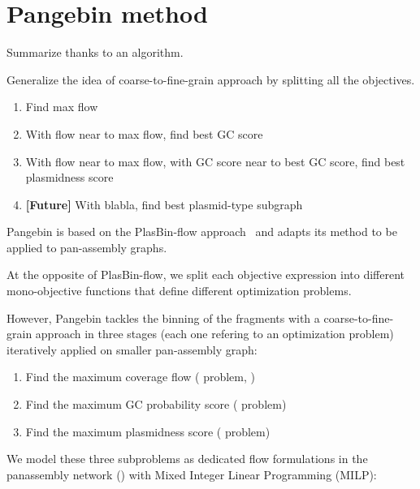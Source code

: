 \section{Pangebin method}

\begin{todobox}
  Summarize thanks to an algorithm.
\end{todobox}

\begin{todobox}
  Generalize the idea of coarse-to-fine-grain approach by splitting all the objectives.

  \begin{enumerate}[label=\roman*.]
    \item Find max flow
    \item With flow near to max flow, find best GC score
    \item With flow near to max flow, with GC score near to best GC score, find best plasmidness score
    \item \textbf{[Future]} With blabla, find best plasmid-type subgraph
  \end{enumerate}
\end{todobox}

Pangebin is based on the PlasBin-flow approach~\cite{manePlasBinflowFlowbasedMILP2023} and adapts its method to be applied to pan-assembly graphs.

\begin{newfeatbox}
  At the opposite of PlasBin-flow, we split each objective expression into different mono-objective functions that define different optimization problems.
\end{newfeatbox}

However, Pangebin tackles the binning of the fragments with a coarse-to-fine-grain approach in three stages (each one refering to an optimization problem) iteratively applied on smaller pan-assembly graph:

\begin{enumerate}[label=\roman*.]
  \item Find the maximum coverage flow (\MCF{} problem, )
  \item Find the maximum GC probability score (\MGC{} problem)
  \item Find the maximum plasmidness score (\MPS{} problem)
\end{enumerate}

We model these three subproblems as dedicated flow formulations in the panassembly network () with Mixed Integer Linear Programming (MILP):

